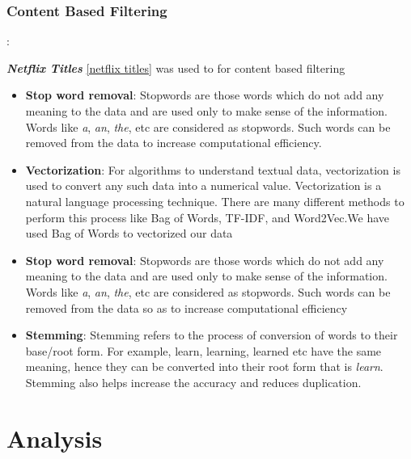 \documentclass[a4paper,10pt]{article}
\begin{document}
\subsubsection{Content Based Filtering}:

\textbf{\textit{Netflix Titles}} \ref{netflix titles} was used to for content based filtering

\begin{itemize}
    \item \textbf{Stop word removal}: Stopwords are those words which do not add any meaning to the data and are used only to make sense of the information. Words like \textit{a}, \textit{an}, \textit{the}, etc are considered as stopwords. Such words can be removed from the data to increase computational efficiency. 
\end{itemize}


\begin{itemize}
    \item \textbf{Vectorization}: For algorithms to understand textual data, vectorization is used to convert any such data into a numerical value. Vectorization is a natural language processing technique. There are many different methods to perform this process like Bag of Words, TF-IDF, and Word2Vec.We have used Bag of Words to vectorized our data
\end{itemize}

\begin{itemize}
    \item \textbf{Stop word removal}: Stopwords are those words which do not add any meaning to the data and are used only to make sense of the information. Words like \textit{a}, \textit{an}, \textit{the}, etc are considered as stopwords. Such words can be removed from the data so as to increase computational efficiency
\end{itemize}

\begin{itemize}
    \item \textbf{Stemming}: Stemming refers to the process of conversion of words to their base/root form. For example, learn, learning, learned etc have the same meaning, hence they can be converted into their root form that is \textit{learn}. Stemming also helps increase the accuracy and reduces duplication. 
\end{itemize}





\section{Analysis}
\end{document}
